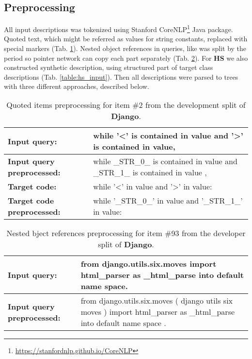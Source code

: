 
\subsection{Preprocessing} \label{preprocessing}

All input descriptions was tokenized using Stanford CoreNLP\footnote{\href{https://stanfordnlp.github.io/CoreNLP}{https://stanfordnlp.github.io/CoreNLP}} Java package. Quoted text, which might be referred as values for string constants, replaced with special markers (Tab. \ref{table:str_markers}). Nested object references in queries, like  was split by the period so pointer network can copy each part separately (Tab. \ref{table:function_calls}). For \textbf{HS} we also constructed synthetic description, using structured part of target class descriptions (Tab. \ref{table:hs_input}). Then all descriptions were parsed to trees with three different approaches, described below.

\begin{table}
\begin{tabularx}{\textwidth}{ l X }
\hline
\textbf{Input query:} & while '<' is contained in value and '>' is contained in value, \\
\hline 
\textbf{Input query preprocessed:} & while \_STR\_0\_ is contained in value and \_STR\_1\_ is contained in value , \\
\hline 
\textbf{Target code:} & while '<' in value and '>' in value: \\
\hline 
\textbf{Target code preprocessed:} & while '\_STR\_0\_' in value and '\_STR\_1\_' in value: \\
\hline
\end{tabularx}
\caption[Quoted items preprocessing]{Quoted items preprocessing for item \#2 from the development split of \textbf{Django}.}
\label{table:str_markers}
\end{table}

\begin{table}
\begin{tabularx}{\textwidth}{ l X }
\hline
\textbf{Input query:} & from django.utils.six.moves import html\_parser as \_html\_parse into default name space. \\
\hline 
\textbf{Input query preprocessed:} & from django.utils.six.moves ( django utils six moves ) import html\_parser as \_html\_parse into default name space . \\
\hline 
\end{tabularx}
\caption[Nested object references preprocessing]{Nested bject references preprocessing for item \#93 from the developer split of \textbf{Django}.}
\label{table:function_calls}
\end{table}


